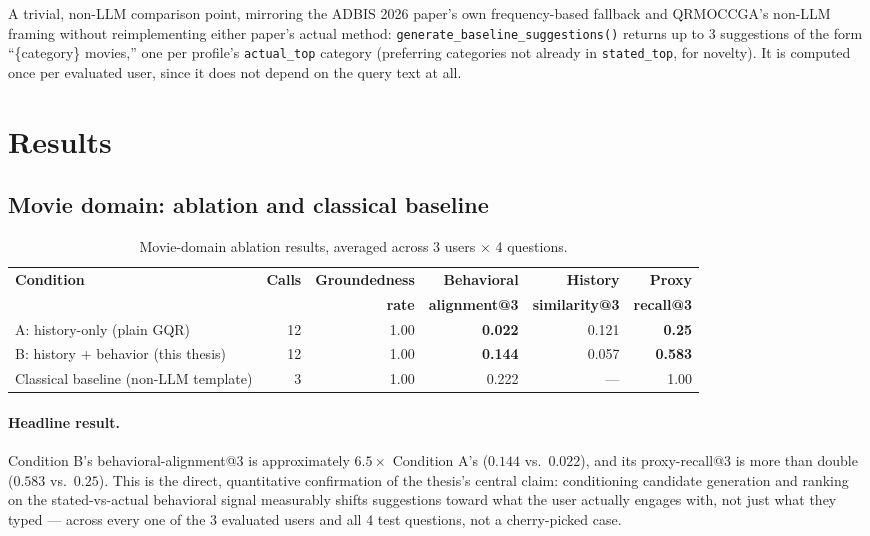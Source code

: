 \documentclass[11pt,a4paper]{article}
\newcommand{\code}[1]{\texttt{#1}}
\begin{document}
A trivial, non-LLM comparison point, mirroring the ADBIS 2026 paper's own frequency-based fallback
and QRMOCCGA's non-LLM framing without reimplementing either paper's actual method:
\code{generate\_baseline\_suggestions()} returns up to 3 suggestions of the form ``\{category\}
movies,'' one per profile's \code{actual\_top} category (preferring categories not already in
\code{stated\_top}, for novelty). It is computed once per evaluated user, since it does not depend
on the query text at all.

\newpage
\section{Results}

\subsection{Movie domain: ablation and classical baseline}

\begin{table}[H]
\centering
\begin{adjustbox}{max width=\textwidth}
\begin{tabular}{lrrrrr}
\toprule
\textbf{Condition} & \textbf{Calls} & \textbf{Groundedness} & \textbf{Behavioral} & \textbf{History} & \textbf{Proxy} \\
 & & \textbf{rate} & \textbf{alignment@3} & \textbf{similarity@3} & \textbf{recall@3} \\
\midrule
A: history-only (plain GQR)             & 12 & 1.00 & \textbf{0.022} & 0.121 & \textbf{0.25} \\
B: history + behavior (this thesis)     & 12 & 1.00 & \textbf{0.144} & 0.057 & \textbf{0.583} \\
Classical baseline (non-LLM template)   & 3  & 1.00 & 0.222          & ---    & 1.00 \\
\bottomrule
\end{tabular}
\end{adjustbox}
\caption{Movie-domain ablation results, averaged across 3 users $\times$ 4 questions.}
\label{tab:ablation}
\end{table}

\paragraph{Headline result.} Condition B's behavioral-alignment@3 is approximately $6.5\times$
Condition A's ($0.144$ vs.\ $0.022$), and its proxy-recall@3 is more than double ($0.583$ vs.\
$0.25$). This is the direct, quantitative confirmation of the thesis's central claim: conditioning
candidate generation and ranking on the stated-vs-actual behavioral signal measurably shifts
suggestions toward what the user actually engages with, not just what they typed --- across every
one of the 3 evaluated users and all 4 test questions, not a cherry-picked case.
\end{document}

